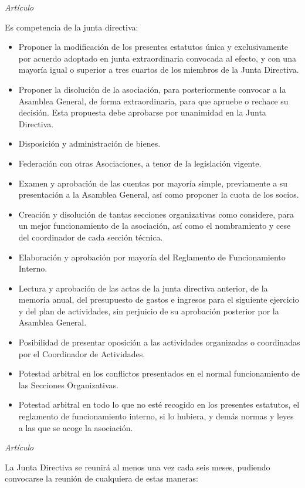 \documentclass[11pt,oneside,onecolumn,a4paper]{article} \usepackage[utf8]{inputenc} \usepackage[spanish]{babel} \usepackage{enumerate} \pagestyle{plain}
\newcounter{articulos} \setcounter{articulos}{1} \newcounter{capitulos} \setcounter{capitulos}{1} \newcounter{titulos} \setcounter{titulos}{1}
\newcommand{\articulo}{\medskip \noindent \emph{Artículo \arabic{articulos} } \smallskip \addtocounter{articulos}{1}} \newcommand{\titulo}[1]{\medskip \noindent \emph{Título \roman{titulos}:} #1 \addcontentsline{toc}{section}{Título \roman{titulos}: #1} \smallskip \addtocounter{titulos}{1}} \newcommand{\capitulo}[1]{\medskip \noindent \emph{Capítulo \roman{capitulos}:} #1 \addcontentsline{toc}{subsection}{Capítulo \roman{capitulos}: #1} \smallskip \addtocounter{capitulos}{1}}
\begin{document}
	\articulo

	Es competencia de la junta directiva:

	\begin{itemize}

	  \item Proponer la modificación de los presentes estatutos única y exclusivamente por acuerdo adoptado en junta extraordinaria convocada al efecto, y con una mayoría igual o superior a tres cuartos de los miembros de la Junta Directiva. \item Proponer la disolución de la asociación, para posteriormente convocar a la Asamblea General, de forma extraordinaria, para que apruebe o rechace su decisión. Esta propuesta debe aprobarse por unanimidad en la Junta Directiva. \item Disposición y administración de bienes. \item Federación con otras Asociaciones, a tenor de la legislación vigente. \item Examen y aprobación de las cuentas por mayoría simple, previamente a su presentación a la Asamblea General, así como proponer la cuota de los socios. \item Creación y disolución de tantas secciones organizativas como considere, para un mejor funcionamiento de la asociación, así como el nombramiento y cese del coordinador de cada sección técnica. \item Elaboración y aprobación por mayoría del Reglamento de Funcionamiento Interno. \item Lectura y aprobación de las actas de la junta directiva anterior, de la memoria anual, del presupuesto de gastos e ingresos para el siguiente ejercicio y del plan de actividades, sin perjuicio de su aprobación posterior por la Asamblea General. \item Posibilidad de presentar oposición a las actividades organizadas o coordinadas por el Coordinador de Actividades. \item Potestad arbitral en los conflictos presentados en el normal funcionamiento de las Secciones Organizativas. \item Potestad arbitral en todo lo que no esté recogido en los presentes estatutos, el reglamento de funcionamiento interno, si lo hubiera, y demás normas y leyes a las que se acoge la asociación.

	  \end{itemize}

	  \articulo

	  La Junta Directiva se reunirá al menos una vez cada seis meses, pudiendo convocarse la reunión de cualquiera de estas maneras:
\end{document}
